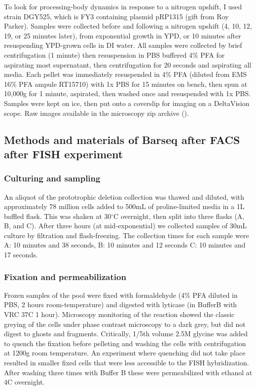 To look for processing-body dynamics in response to
a nitrogen upshift, I used strain DGY525, which is FY3
containing plasmid pRP1315 (gift from Roy Parker).
Samples were collected before and following a nitrogen upshift
(4, 10, 12, 19, or 25 minutes later),
from exponential growth in YPD, 
or 10 minutes after resuspending YPD-grown cells in DI water.
All samples were collected by brief centrifugation (1 minute)
then resuspension in PBS buffered 4\% PFA for 
aspirating most supernatant, then centrifugation for 20 seconds
and aspirating all media. Each pellet was 
immediately resuspended in 4\% PFA 
(diluted from EMS 16\% PFA ampule RT15710) 
with 1x PBS for 15 minutes on bench, 
then spun at 10,000g for 1 minute, aspirated, 
then washed once and resuspended with 1x PBS. 
Samples were kept on ice, then put onto a coverslip
for imaging on a DeltaVision scope. Raw images available in the
microscopy zip archive ().

\subsection{Methods and materials of Barseq after FACS after FISH experiment}

\subsubsection{Culturing and sampling}

An aliquot of the prototrophic deletion collection
\parencite{vandersluis2014broad} was thawed and diluted, with 
approximately 78 million cells added to 500mL of proline-limited media 
in a 1L baffled flask. This was shaken at 30$^{\circ}$C overnight, 
then split into three flasks (A, B, and C). 
After three hours (at mid-exponential)
we collected samples of 30mL culture by filtration and flash-freezing.
The collection times for each
sample were A: 10 minutes and 38 seconds, B: 10 minutes and 12 seconds
C: 10 minutes and 17 seconds.

\subsubsection{Fixation and permeabilization}

Frozen samples of the pool were fixed with formaldehyde
(4\% PFA diluted in PBS, 2 hours room-temperature) and digested
with lyticase (in BufferB with VRC 37C 1 hour).
Microscopy monitoring of the reaction showed the classic
greying of the cells under phase contrast microscopy to a dark grey, 
but did not digest to ghosts and fragments. 
Critically, 1/5th volume 2.5M glycine was added to quench the 
fixation before pelleting and washing the cells with centrifugation
at 1200g room temperature. An experiment where quenching did not
take place resulted in smaller fixed cells that were less accessible
to the FISH hybridization.
After washing three times with Buffer B \parencite{pringle199140} 
these were permeabilized with ethanol at
4C overnight.


